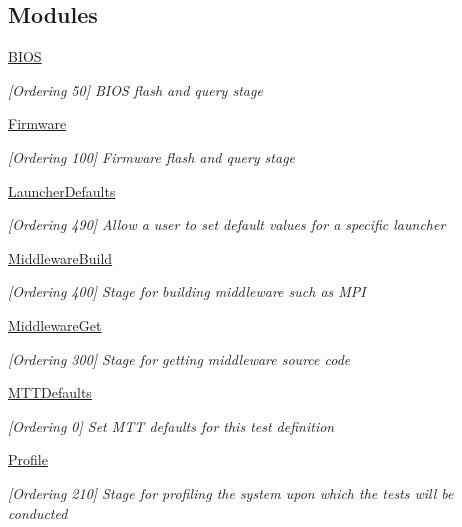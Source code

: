 \subsection*{Modules}
\begin{DoxyCompactItemize}
\item 
\hyperlink{group__BIOS}{B\-I\-O\-S}
\begin{DoxyCompactList}\small\item\em \mbox{[}Ordering 50\mbox{]} B\-I\-O\-S flash and query stage \end{DoxyCompactList}\item 
\hyperlink{group__Firmware}{Firmware}
\begin{DoxyCompactList}\small\item\em \mbox{[}Ordering 100\mbox{]} Firmware flash and query stage \end{DoxyCompactList}\item 
\hyperlink{group__LauncherDefaults}{Launcher\-Defaults}
\begin{DoxyCompactList}\small\item\em \mbox{[}Ordering 490\mbox{]} Allow a user to set default values for a specific launcher \end{DoxyCompactList}\item 
\hyperlink{group__MiddlewareBuild}{Middleware\-Build}
\begin{DoxyCompactList}\small\item\em \mbox{[}Ordering 400\mbox{]} Stage for building middleware such as M\-P\-I \end{DoxyCompactList}\item 
\hyperlink{group__MiddlewareGet}{Middleware\-Get}
\begin{DoxyCompactList}\small\item\em \mbox{[}Ordering 300\mbox{]} Stage for getting middleware source code \end{DoxyCompactList}\item 
\hyperlink{group__MTTDefaults}{M\-T\-T\-Defaults}
\begin{DoxyCompactList}\small\item\em \mbox{[}Ordering 0\mbox{]} Set M\-T\-T defaults for this test definition \end{DoxyCompactList}\item 
\hyperlink{group__Profile}{Profile}
\begin{DoxyCompactList}\small\item\em \mbox{[}Ordering 210\mbox{]} Stage for profiling the system upon which the tests will be conducted \end{DoxyCompactList}\item 

\end{DoxyCompactItemize}
